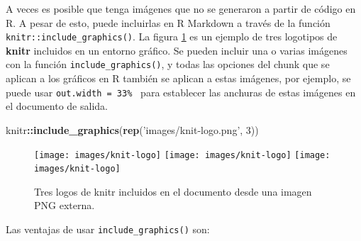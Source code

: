 \documentclass[12pt,]{krantz}
\makeatletter
\newenvironment{Shaded}{\begin{snugshade}}{\end{snugshade}}
\newcommand{\KeywordTok}[1]{\textcolor[rgb]{0.13,0.29,0.53}{\textbf{#1}}}
\newcommand{\DecValTok}[1]{\textcolor[rgb]{0.00,0.00,0.81}{#1}}
\newcommand{\StringTok}[1]{\textcolor[rgb]{0.31,0.60,0.02}{#1}}
\newcommand{\OperatorTok}[1]{\textcolor[rgb]{0.81,0.36,0.00}{\textbf{#1}}}
\newcommand{\NormalTok}[1]{#1}
\newenvironment{kframe}{%
\medskip{}
\setlength{\fboxsep}{.8em}
 \def\at@end@of@kframe{}%
 \ifinner\ifhmode%
  \def\at@end@of@kframe{\end{minipage}}%
  \begin{minipage}{\columnwidth}%
 \fi\fi%
 \def\FrameCommand##1{\hskip\@totalleftmargin \hskip-\fboxsep
 \colorbox{shadecolor}{##1}\hskip-\fboxsep
     \hskip-\linewidth \hskip-\@totalleftmargin \hskip\columnwidth}%
 \MakeFramed {\advance\hsize-\width
   \@totalleftmargin\z@ \linewidth\hsize
   \@setminipage}}%
 {\par\unskip\endMakeFramed%
 \at@end@of@kframe}
\renewenvironment{Shaded}{\begin{kframe}}{\end{kframe}}
\theoremstyle{definition}
\theoremstyle{definition}
\theoremstyle{definition}
\theoremstyle{remark}
\makeatother
\begin{document}
A veces es posible que tenga imágenes que no se generaron a partir de
código en R. A pesar de esto, puede incluirlas en R Markdown a través de
la función \texttt{knitr::include\_graphics()}. La figura
\ref{fig:knitr-logo2} es un ejemplo de tres logotipos de \textbf{knitr}
incluidos en un entorno gráfico. Se pueden incluir una o varias imágenes
con la función \texttt{include\_graphics()}, y todas las opciones del
chunk que se aplican a los gráficos en R también se aplican a estas
imágenes, por ejemplo, se puede usar
\texttt{out.width\ =\ \textquotesingle{}33\%\ \textquotesingle{}} para
establecer las anchuras de estas imágenes en el documento de salida.

\begin{Shaded}
\begin{Highlighting}[]
\NormalTok{knitr}\OperatorTok{::}\KeywordTok{include_graphics}\NormalTok{(}\KeywordTok{rep}\NormalTok{(}\StringTok{'images/knit-logo.png'}\NormalTok{, }\DecValTok{3}\NormalTok{))}
\end{Highlighting}
\end{Shaded}

\begin{figure}
\texttt{[image: images/knit-logo]} \texttt{[image: images/knit-logo]} \texttt{[image: images/knit-logo]} \caption{Tres logos de knitr incluidos en el documento desde una imagen PNG externa.}\label{fig:knitr-logo2}
\end{figure}

Las ventajas de usar \texttt{include\_graphics()} son:
\end{document}
